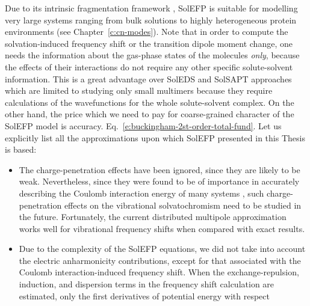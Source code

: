 \documentclass[a4paper,titlepage,twoside,fleqn,12pt]{book}
\begin{document}
\begin{refsection}
Due to its intrinsic fragmentation framework \citep{Gordon.Fedorov.Pruitt.Slipchenko.ChemRev.2012}, 
SolEFP is suitable for modelling very large systems
ranging from bulk solutions to highly heterogeneous
protein environments \citep{Blasiak.Ritchie.Webb.Cho.PCCP.2016} 
(see Chapter~\ref{c:cn-modes}). Note that in order
to compute the solvation\hyp{}induced frequency shift or the
transition dipole moment change, one needs the information
about the gas\hyp{}phase states of the molecules \emph{only}, 
because the effects of their interactions do not require 
any other specific solute\hyp{}solvent information.
This is a great advantage over SolEDS and SolSAPT approaches
which are limited to studying only small multimers because 
they require calculations of the wavefunctions for the whole
solute\hyp{}solvent complex. On the other hand, the price
which we need to pay for coarse\hyp{}grained character of the SolEFP model
is accuracy.
Eq.~\eqref{e:buckingham-2st-order-total-fund}. 
Let us 
explicitly list all the approximations upon which SolEFP presented in 
this Thesis is based:
%
\begin{itemize}
 \item The charge\hyp{}penetration effects have been ignored, since they are likely to be weak. 
Nevertheless, since they were found to be of importance in accurately describing 
the Coulomb interaction energy of many systems \citep{Slipchenko.Gordon.JCC.2007}, 
such charge\hyp{}penetration 
effects on the vibrational solvatochromism need to be studied in the future. Fortunately,
the current distributed multipole approximation works well for vibrational frequency shifts
when compared with exact results. \citep{Blasiak.Cho.JCP.2014,Blasiak.Cho.JCP.2015,
Blasiak.Ritchie.Webb.Cho.PCCP.2016,Maj.Ahn.Blasiak.Kwak.Han.Cho.XXX.2016}
 \item Due to the complexity of the SolEFP equations, we did not take into account the electric 
anharmonicity contributions, except for that associated with the Coulomb interaction\hyp{}induced 
frequency shift. When the exchange\hyp{}repulsion, induction, and dispersion terms in the frequency 
shift calculation are estimated, only the first derivatives of potential energy with respect 

\end{itemize}
\end{refsection}
\end{document}

